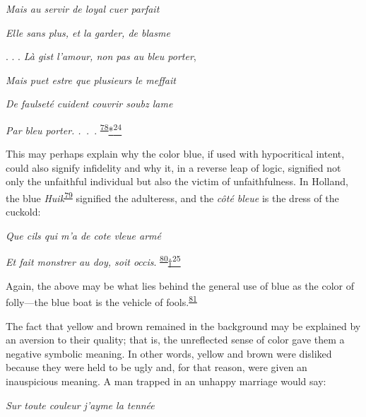 \emph{Mais au servir de loyal cuer parfait}

\emph{Elle sans plus, et la garder, de blasme}

.\emph{} . . \emph{Là gist l'amour, non pas au bleu porter},

\emph{Mais puet estre que plusieurs le meffait}

\emph{De faulseté cuident couvrir soubz lame}

\emph{Par bleu porter. .~.~}.
\textsuperscript{\protect\hypertarget{20_ILLUSTRATIONS_FOLLOW_PAGE.xhtmlux5cux23id_318}{\protect\hyperlink{23_NOTES.xhtmlux5cux23id_319}{78}}}\protect\hypertarget{20_ILLUSTRATIONS_FOLLOW_PAGE.xhtmlux5cux23id_2697}{\protect\hyperlink{23_NOTES.xhtmlux5cux23id_2698}{*\textsuperscript{24}}}

This may perhaps explain why the color blue, if used with hypocritical
intent, could also signify infidelity and why it, in a reverse leap of
logic, signified not only the unfaithful individual but also the victim
of unfaithfulness. In Holland, the blue
\emph{Huik}\textsuperscript{\protect\hypertarget{20_ILLUSTRATIONS_FOLLOW_PAGE.xhtmlux5cux23id_316}{\protect\hyperlink{23_NOTES.xhtmlux5cux23id_317}{79}}}
signified the adulteress, and the \emph{côté bleue} is the dress of the
cuckold:

\emph{Que cils qui m'a de cote vleue armé}

\emph{Et fait monstrer au doy, soit occis}.
\textsuperscript{\protect\hypertarget{20_ILLUSTRATIONS_FOLLOW_PAGE.xhtmlux5cux23id_314}{\protect\hyperlink{23_NOTES.xhtmlux5cux23id_315}{80}}}\protect\hypertarget{20_ILLUSTRATIONS_FOLLOW_PAGE.xhtmlux5cux23id_2699}{\protect\hyperlink{23_NOTES.xhtmlux5cux23id_2700}{†\textsuperscript{25}}}

Again, the above may be what lies behind the general use of blue as the
color of folly---the blue boat is the vehicle of
fools.\textsuperscript{\protect\hypertarget{20_ILLUSTRATIONS_FOLLOW_PAGE.xhtmlux5cux23id_312}{\protect\hyperlink{23_NOTES.xhtmlux5cux23id_313}{81}}}

The fact that yellow and brown remained in the background may be
explained by an aversion to their quality; that is, the unreflected
sense of color gave them a negative symbolic meaning. In other words,
yellow and brown were disliked because they were held to be ugly and,
for that reason, were given an inauspicious meaning. A man trapped in an
unhappy marriage would say:

\emph{Sur toute couleur j'ayme la tennée}

